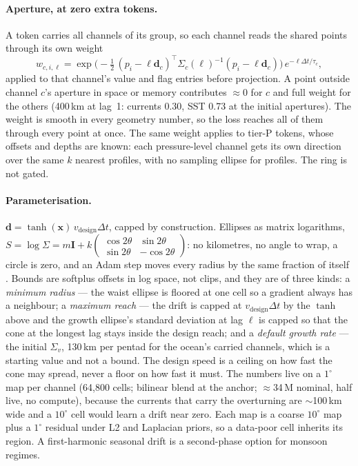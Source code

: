 \documentclass[10pt]{article}
\begin{document}
\paragraph{Aperture, at zero extra tokens.} A token carries all channels of
its group, so each channel reads the shared points through its own weight
\begin{equation}
w_{c,i,\ell}=\exp\!\big(-\tfrac12\,(p_i-\ell\mathbf{d}_c)^{\top}\Sigma_c(\ell)^{-1}(p_i-\ell\mathbf{d}_c)\big)\,
e^{-\ell\Delta t/\tau_c},
\end{equation}
applied to that channel's value and flag entries before projection. A point
outside channel $c$'s aperture in space or memory contributes ${\approx}$0
for $c$ and full weight for the others (400\,km at lag~1: currents 0.30, SST
0.73 at the initial apertures). The weight is smooth in every geometry
number, so the loss reaches all of them through every point at once. The same
weight applies to tier-P tokens, whose offsets and depths are known: each
pressure-level channel gets its own direction over the same $k$ nearest
profiles, with no sampling ellipse for profiles. The ring is not gated.

\paragraph{Parameterisation.} $\mathbf{d}=\tanh(\mathbf{x})\,v_{\text{design}}
\Delta t$, capped by construction. Ellipses as matrix logarithms,
$S=\log\Sigma=m\mathbf{I}+k\begin{pmatrix}\cos2\theta&\sin2\theta\\
\sin2\theta&-\cos2\theta\end{pmatrix}$: no kilometres, no angle to wrap, a
circle is zero, and an Adam step moves every radius by the same fraction of
itself \cite{adam}. Bounds are softplus offsets in log space, not clips, and
they are of three kinds: a \emph{minimum radius} --- the waist ellipse is
floored at one cell so a gradient always has a neighbour; a \emph{maximum
reach} --- the drift is capped at $v_{\text{design}}\Delta t$ by the $\tanh$
above and the growth ellipse's standard deviation at lag $\ell$ is capped so
that the cone at the longest lag stays inside the design reach; and a
\emph{default growth rate} --- the initial $\Sigma_v$, 130\,km per pentad for
the ocean's carried channels, which is a starting value and not a bound. The
design speed is a ceiling on how fast the cone may spread, never a floor on
how fast it must. The numbers live on a $1^\circ$ map
per channel (64{,}800 cells; bilinear blend at the anchor; ${\approx}$34\,M
nominal, half live, no compute), because the currents that carry the
overturning are ${\sim}$100\,km wide and a $10^\circ$ cell would learn a
drift near zero. Each map is a coarse $10^\circ$ map plus a $1^\circ$
residual under L2 and Laplacian priors, so a data-poor cell inherits its
region. A first-harmonic seasonal drift is a second-phase option for monsoon
regimes.
\end{document}
